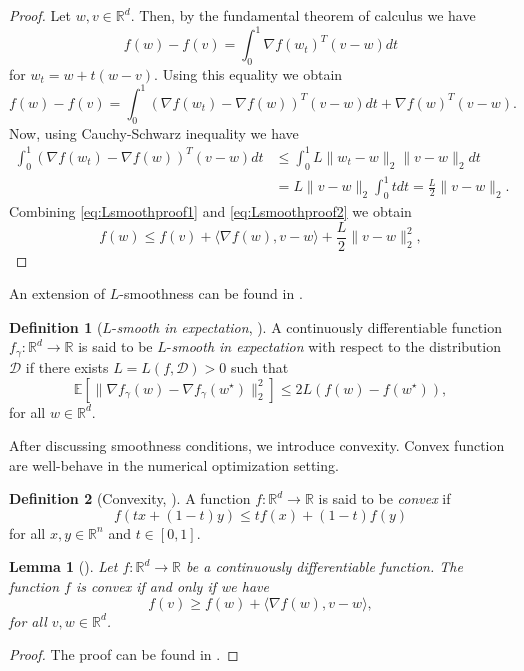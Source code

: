 \documentclass[12pt]{article}
\newtheorem{lemma}[lemma]{Lemma}
\theoremstyle{definition}
\newtheorem{definition}[definition]{Definition}
\numberwithin{equation}{section}
\newcommand{\R}{\mathbb{R}}
\newcommand{\norm}[1]{\lVert{#1}\rVert_2}
\begin{document}
\begin{proof}
  Let $w, v \in \mathbb{R}^d$. Then, by the fundamental theorem of calculus we have
  $$
  f(w) - f(v) = \int_0^1 \nabla f(w_t)^T(v-w)dt 
  $$
  for $w_t = w + t(w-v)$.
  Using this equality we obtain
  \begin{equation}
    \label{eq:Lsmoothproof1}
    f(w) - f(v) = \int_0^1 (\nabla f(w_t) - \nabla f(w))^T(v-w)dt + \nabla f(w)^T(v-w).
  \end{equation}
  Now, using Cauchy-Schwarz inequality we have
  \begin{align}
    \label{eq:Lsmoothproof2}
    \int_0^1 (\nabla f(w_t) - \nabla f(w))^T(v-w)dt &\leq \int_0^1 L \norm{w_t-w} \norm{v-w}dt \\
    &= L \norm{v-w} \int_0^1 t dt = \frac{L}{2} \norm{v-w}.
  \end{align}
  Combining \eqref{eq:Lsmoothproof1} and \eqref{eq:Lsmoothproof2} we obtain
  \begin{equation*}
    f(w) \leq f(v) + \langle \nabla f(w), v - w \rangle + \frac{L}{2} \norm{v - w}^2,
  \end{equation*}
\end{proof}
An extension of $L$-smoothness can be found in \cite{gowerSGDGeneralAnalysis2019}.
\begin{definition}[$L$-\emph{smooth in expectation}, ]
  A continuously differentiable  function $f_{\gamma}:\mathbb{R}^d \rightarrow \mathbb{R}$ is said to be $L$-\emph{smooth in expectation} with respect to the distribution $\mathcal{D}$ if there exists $L = L(f, \mathcal{D}) > 0$ such that 
  \begin{equation}
    \mathbb{E}[\norm{\nabla f_{\gamma}(w) - \nabla f_{\gamma}(w^\star)}^2] \leq 2 L(f(w) - f(w^\star)),
  \end{equation}
  for all $w \in \mathbb{R}^d$. 
\end{definition}
After discussing smoothness conditions, we introduce convexity. Convex function are well-behave in the numerical optimization setting.
\begin{definition}[Convexity, ]
  A function $f : \mathbb{R}^d \rightarrow \mathbb{R}$ is said to be \emph{convex} if 
  \begin{equation}
    f(tx+(1-t)y) \leq tf(x)+(1-t)f(y)
  \end{equation}
  for all $x,y \in \mathbb{R}^n$ and $t \in [0,1]$.
\end{definition}
\begin{lemma}[]
  \label{lemma:convexity}
  Let $f : \mathbb{R}^d \rightarrow \mathbb{R}$ be a continuously differentiable function. The function $f$ is convex if and only if we have
  \begin{equation*}
    f(v) \geq f(w) + \langle \nabla f(w), v-w \rangle,
  \end{equation*}
  for all $v,w \in \R^d$.
\end{lemma}
\begin{proof}
  The proof can be found in \autocite{boydConvexOptimization2004}.
\end{proof}
\end{document}
